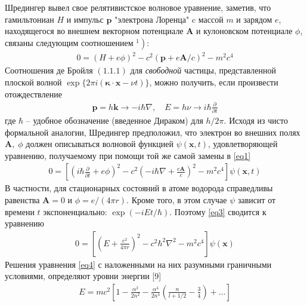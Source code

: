 \documentclass[a5paper,10pt]{article}
\theoremstyle{plain} %
\theoremstyle{definition} %
\theoremstyle{remark} %
\begin{document}
\newcommand{\anonsection}[1]{\section*{#1}\addcontentsline{toc}{part}{#1}}
\newcommand{\un}{\underline}
\newcommand{\ve}{\vec}



Шредингер вывел свое релятивистское волновое уравнение, заметив, что гамильтониан $H$ и импульс $\mathbf{p}$ "электрона Лоренца" $\mathrm{c}$ массой $m$ и зарядом $e$, находящегося во внешнем векторном потенциале $\mathbf{A}$ и кулоновском потенциале $\phi$, связаны следующим соотношением $\left.^{1}\right):$
\begin{align}\label{eq1}
0=(H+e \phi)^{2}-c^{2}(\mathbf{p}+e \mathbf{A} / c)^{2}-m^{2} c^{4}
\end{align}
Соотношения де Бройля $(1.1 .1)$ для \textit{свободной} частицы, представленной плоской волной $\exp \{2 \pi i(\boldsymbol{\kappa} \cdot \mathbf{x}-\nu t)\}$, можно получить, если произвести отождествление
\begin{align}\label{eq2}
\mathbf{p}=h \mathbf{k} \rightarrow-i \hbar \nabla, \quad E=h \nu \rightarrow i \hbar \frac{\partial}{\partial t}
\end{align}
где $\hbar$ -- удобное обозначение (введенное Дираком) для $h / 2 \pi .$ Исходя из чисто формальной аналогии, Шредингер предположил, что электрон во внешних полях $\mathbf{A}, \;\phi$ должен описываться волновой функцией $\psi(\mathbf{x}, t)$, удовлетворяющей уравнению, получаемому при помощи той же самой замены в \ref{eq1}
\begin{align}\label{eq3}
0=\left[\left(i \hbar \frac{\partial}{\partial t}+e \phi\right)^{2}-c^{2}\left(-i \hbar \nabla+\frac{e \mathbf{A}}{c}\right)^{2}-m^{2} c^{4}\right] \psi(\mathbf{x}, t)
\end{align}
В частности, для стационарных состояний в атоме водорода справедливы равенства $\mathbf{A}=0$ и $\phi=e /(4 \pi r) .$ Кроме того, в этом случае $\psi$ зависит от времени $t$ экспоненциально: $\exp (-i E t / \hbar) .$ Поэтому \ref{eq3} сводится к уравнению
\begin{align}\label{eq4}
0=\left[\left(E+\frac{e^{2}}{4 \pi r}\right)^{2}-c^{2} \hbar^{2} \nabla^{2}-m^{2} c^{4}\right] \psi(\mathbf{x})
\end{align}
Решения уравнения \ref{eq4} с наложенными на них разумными граничными условиями, определяют уровни энергии [9]
\begin{align}\label{eq5}
E=m c^{2}\left[1-\frac{\alpha^{2}}{2 n^{2}}-\frac{\alpha^{4}}{2 n^{4}}\left(\frac{n}{l+1 / 2}-\frac{3}{4}\right)+\ldots\right]
\end{align}
\end{document}
